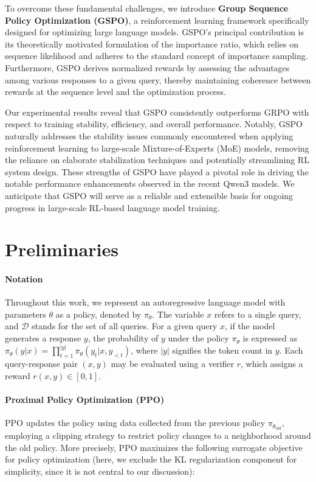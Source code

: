 To overcome these fundamental challenges, we introduce \textbf{Group Sequence Policy Optimization (GSPO)}, a reinforcement learning framework specifically designed for optimizing large language models. GSPO’s principal contribution is its theoretically motivated formulation of the importance ratio, which relies on sequence likelihood \citep{click} and adheres to the standard concept of importance sampling. Furthermore, GSPO derives normalized rewards by assessing the advantages among various responses to a given query, thereby maintaining coherence between rewards at the sequence level and the optimization process.

Our experimental results reveal that GSPO consistently outperforms GRPO with respect to training stability, efficiency, and overall performance. Notably, GSPO naturally addresses the stability issues commonly encountered when applying reinforcement learning to large-scale Mixture-of-Experts (MoE) models, removing the reliance on elaborate stabilization techniques and potentially streamlining RL system design. These strengths of GSPO have played a pivotal role in driving the notable performance enhancements observed in the recent Qwen3 models. We anticipate that GSPO will serve as a reliable and extensible basis for ongoing progress in large-scale RL-based language model training.

\section{Preliminaries}

\paragraph{Notation}
Throughout this work, we represent an autoregressive language model with parameters $\theta$ as a policy, denoted by $\pi_\theta$. The variable $x$ refers to a single query, and $\mathcal{D}$ stands for the set of all queries. For a given query $x$, if the model generates a response $y$, the probability of $y$ under the policy $\pi_\theta$ is expressed as $\pi_\theta (y | x)=\prod_{t=1}^{|y|} \pi_\theta (y_t | x, y_{<t})$, where $|y|$ signifies the token count in $y$. Each query-response pair $(x, y)$ may be evaluated using a verifier $r$, which assigns a reward $r(x, y) \in [0, 1]$.

\paragraph{Proximal Policy Optimization (PPO)} PPO \citep{ppo} updates the policy using data collected from the previous policy $\pi_{\theta_\text{old}}$, employing a clipping strategy to restrict policy changes to a neighborhood around the old policy. More precisely, PPO maximizes the following surrogate objective for policy optimization (here, we exclude the KL regularization component for simplicity, since it is not central to our discussion):

